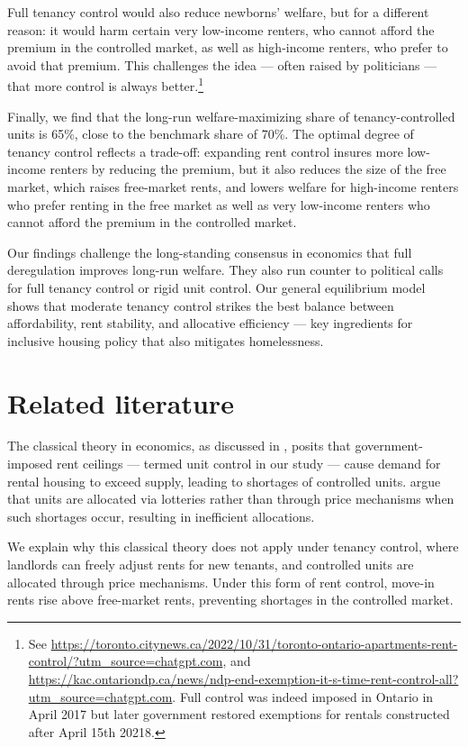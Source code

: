 \documentclass[parskip=full]{article}
\begin{document}
Full tenancy control would also reduce newborns’ welfare, but for a different reason: it would harm certain very low-income renters, who cannot afford the premium in the controlled market, as well as high-income renters, who prefer to avoid that premium. This challenges the idea — often raised by politicians — that more control is always better.\footnote{See \url{https://toronto.citynews.ca/2022/10/31/toronto-ontario-apartments-rent-control/?utm_source=chatgpt.com}, and \url{https://kac.ontariondp.ca/news/ndp-end-exemption-it-s-time-rent-control-all?utm_source=chatgpt.com}. Full control was indeed imposed in Ontario in April 2017 but later government restored exemptions for rentals constructed after April 15th 20218.}

Finally, we find that the long-run welfare-maximizing share of tenancy-controlled units is 65\%, close to the benchmark share of 70\%. The optimal degree of tenancy control reflects a trade-off: expanding rent control insures more low-income renters by reducing the premium, but it also reduces the size of the free market, which raises free-market rents, and lowers welfare for high-income renters who prefer renting in the free market as well as very low-income renters who cannot afford the premium in the controlled market.

Our findings challenge the long-standing consensus in economics that full deregulation improves long-run welfare. They also run counter to political calls for full tenancy control or rigid unit control. Our general equilibrium model shows that moderate tenancy control strikes the best balance between affordability, rent stability, and allocative efficiency — key ingredients for inclusive housing policy that also mitigates homelessness.

\section{Related literature}\label{sec:related_lit}

The classical theory in economics, as discussed in \citet{suen-1989}, posits that government-imposed rent ceilings — termed unit control in our study — cause demand for rental housing to exceed supply, leading to shortages of controlled units. \citet{gl-2003} argue that units are allocated via lotteries rather than through price mechanisms when such shortages occur, resulting in inefficient allocations.

We explain why this classical theory does not apply under tenancy control, where landlords can freely adjust rents for new tenants, and controlled units are allocated through price mechanisms. Under this form of rent control, move-in rents rise above free-market rents, preventing shortages in the controlled market.
\end{document}
